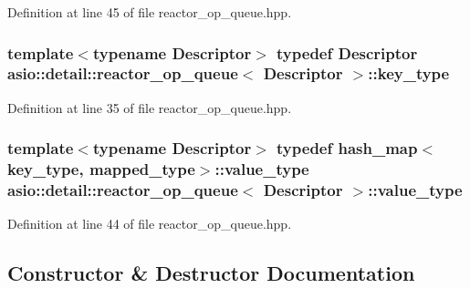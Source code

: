 Definition at line 45 of file reactor\+\_\+op\+\_\+queue.\+hpp.

\hypertarget{classasio_1_1detail_1_1reactor__op__queue_ae750b96efe78afd9b508725eedcd6b8b}{}
\subsubsection[{key\+\_\+type}]{\setlength{\rightskip}{0pt plus 5cm}template$<$typename Descriptor$>$ typedef Descriptor {\bf asio\+::detail\+::reactor\+\_\+op\+\_\+queue}$<$ Descriptor $>$\+::{\bf key\+\_\+type}}\label{classasio_1_1detail_1_1reactor__op__queue_ae750b96efe78afd9b508725eedcd6b8b}


Definition at line 35 of file reactor\+\_\+op\+\_\+queue.\+hpp.

\hypertarget{classasio_1_1detail_1_1reactor__op__queue_ac701f8db7606c9f4f1457116046b7b31}{}
\subsubsection[{value\+\_\+type}]{\setlength{\rightskip}{0pt plus 5cm}template$<$typename Descriptor$>$ typedef {\bf hash\+\_\+map}$<${\bf key\+\_\+type}, {\bf mapped\+\_\+type}$>$\+::{\bf value\+\_\+type} {\bf asio\+::detail\+::reactor\+\_\+op\+\_\+queue}$<$ Descriptor $>$\+::{\bf value\+\_\+type}}\label{classasio_1_1detail_1_1reactor__op__queue_ac701f8db7606c9f4f1457116046b7b31}


Definition at line 44 of file reactor\+\_\+op\+\_\+queue.\+hpp.



\subsection{Constructor \& Destructor Documentation}
\hypertarget{classasio_1_1detail_1_1reactor__op__queue_a3d4dc141c50d2f58f63921ef38792cbc}{}
